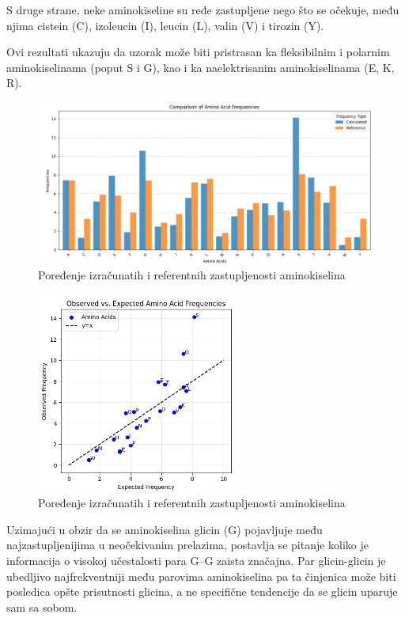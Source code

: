 \documentclass[a4paper,12pt]{article}
\begin{document}
S druge strane, neke aminokiseline su ređe zastupljene nego što se očekuje, među njima
cistein (C), izoleucin (I), leucin (L), valin (V) i tirozin (Y).  

Ovi rezultati ukazuju da uzorak može biti pristrasan ka fleksibilnim i polarnim
aminokiselinama (poput S i G), kao i ka naelektrisanim aminokiselinama (E, K, R).

\begin{figure}[htbp]
    \centering
    \includegraphics[width=1\textwidth]{./images/aafreq.barplot.png}
    \caption{Poređenje izračunatih i referentnih zastupljenosti aminokiselina}
    \label{Slika:aafreq.barplot}
\end{figure}

\begin{figure}[htbp]
    \centering
    \includegraphics[width=0.6\textwidth]{./images/obsvsexp.png}
    \caption{Poređenje izračunatih i referentnih zastupljenosti aminokiselina}
    \label{Slika:obsvsexp}
\end{figure}

Uzimajući u obzir da se aminokiselina glicin (G) pojavljuje među najzastupljenijima u neočekivanim prelazima, postavlja se pitanje koliko je informacija o visokoj učestalosti para G–G zaista značajna. Par glicin-glicin je ubedljivo najfrekventniji među parovima aminokiselina pa ta činjenica može biti posledica opšte prisutnosti glicina, a ne specifične tendencije da se glicin uparuje sam sa sobom.
\end{document}
